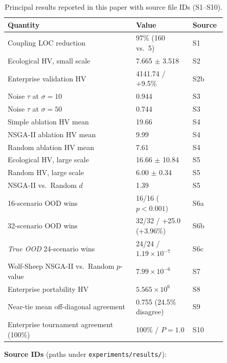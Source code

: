 \documentclass{wscpaperproc}
\begin{document}
\begin{table}[ht]
\caption{Principal results reported in this paper with source file IDs (S1--S10).}
\label{tab:appendix-results}
\centering\small
\begin{tabular}{p{0.52\linewidth}p{0.23\linewidth}p{0.1\linewidth}}
\toprule
Quantity & Value & Source \\
\midrule
Coupling LOC reduction & 97\% (160 vs.\ 5) & S1 \\
Ecological HV, small scale & 7.665 $\pm$ 3.518 & S2 \\
Enterprise validation HV & 4141.74 / +9.5\% & S2b \\
Noise $\tau$ at $\sigma\!=\!10$ & 0.944 & S3 \\
Noise $\tau$ at $\sigma\!=\!50$ & 0.744 & S3 \\
Simple ablation HV mean & 19.66 & S4 \\
NSGA-II ablation HV mean & 9.99 & S4 \\
Random ablation HV mean & 7.61 & S4 \\
\midrule
Ecological HV, large scale & 16.66 $\pm$ 10.84 & S5 \\
Random HV, large scale & 6.00 $\pm$ 0.34 & S5 \\
NSGA-II vs.\ Random $d$ & 1.39 & S5 \\
16-scenario OOD wins & 16/16 ($p\!<\!0.001$) & S6a \\
32-scenario OOD wins & 32/32 / +25.0 (+3.96\%) & S6b \\
\textit{True OOD} 24-scenario wins & 24/24 / $1.19\!\times\!10^{-7}$ & S6c \\
Wolf-Sheep NSGA-II vs.\ Random $p$-value & $7.99\!\times\!10^{-6}$ & S7 \\
Enterprise portability HV & $5.565\!\times\!10^{6}$ & S8 \\
Near-tie mean off-diagonal agreement & 0.755 (24.5\% disagree) & S9 \\
Enterprise tournament agreement (100\%) & 100\% / $P\!=\!1.0$ & S10 \\
\bottomrule
\end{tabular}
\end{table}

\noindent\textbf{Source IDs} (paths under \texttt{experiments/results/}):
\end{document}
